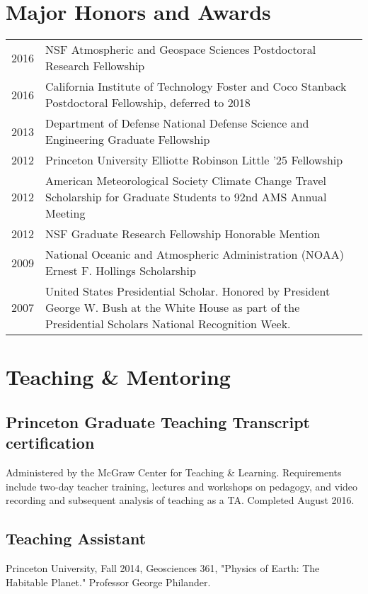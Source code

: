 \documentclass{article}
\begin{document}
\section*{Major Honors and Awards}
\label{sec:org3b6e606}
\begin{center}
\begin{tabularx}{\textwidth}{lX}
2016 & NSF Atmospheric and Geospace Sciences Postdoctoral Research Fellowship\\
2016 & California Institute of Technology Foster and Coco Stanback Postdoctoral Fellowship, deferred to 2018\\
2013 & Department of Defense National Defense Science and Engineering Graduate Fellowship\\
2012 & Princeton University Elliotte Robinson Little '25 Fellowship\\
2012 & American Meteorological Society Climate Change Travel Scholarship for Graduate Students to 92nd AMS Annual Meeting\\
2012 & NSF Graduate Research Fellowship Honorable Mention\\
2009 & National Oceanic and Atmospheric Administration (NOAA) Ernest F. Hollings Scholarship\\
2007 & United States Presidential Scholar.  Honored by President George W. Bush at the White House as part of the Presidential Scholars National Recognition Week.\\
\end{tabularx}
\end{center}
\section*{Teaching \& Mentoring}
\label{sec:org2364c29}
\subsection*{Princeton Graduate Teaching Transcript certification}
\label{sec:orgbcfa400}
Administered by the McGraw Center for Teaching \& Learning.  Requirements include
two-day teacher training, lectures and workshops on pedagogy, and video recording
and subsequent analysis of teaching as a TA.  Completed August 2016.
\subsection*{Teaching Assistant}
\label{sec:org7998131}
Princeton University, Fall 2014, Geosciences 361, "Physics of Earth: The
Habitable Planet."  Professor George Philander.
\end{document}
